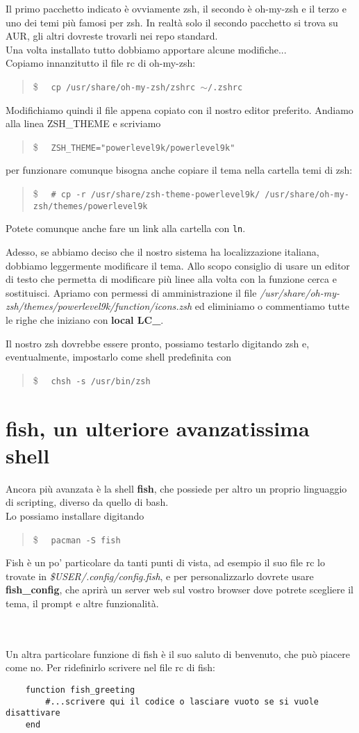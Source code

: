 \documentclass[twoside,italian]{book}
\newcommand{\code}[1]{\texttt{#1}}
\newcommand{\shellcode}[1]{\$$\quad$ \texttt{#1}}
\newcommand{\centcode}[1]{
	\begin{quote}
		\color{code}
		\shellcode{#1}
	\end{quote}
}
\newcommand{\nlinea}{
	\leavevmode
	\\
}
\begin{document}
			Il primo pacchetto indicato è ovviamente zsh, il secondo è oh-my-zsh e il terzo e uno dei temi più famosi per zsh. In realtà solo il secondo pacchetto si trova su AUR, gli altri dovreste trovarli nei repo standard.\\
			
			Una volta installato tutto dobbiamo apportare alcune modifiche...\\
			Copiamo innanzitutto il file rc di oh-my-zsh:\centcode{cp /usr/share/oh-my-zsh/zshrc $\sim$/.zshrc}
			
			Modifichiamo quindi il file appena copiato con il nostro editor preferito. Andiamo alla linea ZSH\_THEME e scriviamo \centcode{ZSH\_THEME="powerlevel9k/powerlevel9k"}
			
			per funzionare comunque bisogna anche copiare il tema nella cartella temi di zsh:
			\centcode{\# cp -r /usr/share/zsh-theme-powerlevel9k/ /usr/share/oh-my-zsh/themes/powerlevel9k}
			Potete comunque anche fare un link alla cartella con \code{ln}.
			
			Adesso, se abbiamo deciso che il nostro sistema ha localizzazione italiana, dobbiamo leggermente modificare il tema. Allo scopo consiglio di usare un editor di testo che permetta di modificare più linee alla volta con la funzione cerca e sostituisci. Apriamo con permessi di amministrazione il file \textit{/usr/share/oh-my-zsh/themes/powerlevel9k/function/icons.zsh} ed eliminiamo o commentiamo tutte le righe che iniziano con \textbf{local LC\_}.
			
			Il nostro zsh dovrebbe essere pronto, possiamo testarlo digitando zsh e, eventualmente, impostarlo come shell predefinita con \centcode{chsh -s /usr/bin/zsh}
			
		\section{fish, un ulteriore avanzatissima shell}
			
			Ancora più avanzata è la shell \textbf{fish}, che possiede per altro un proprio linguaggio di scripting, diverso da quello di bash.\\
			
			Lo possiamo installare digitando \centcode{pacman -S fish}
			
			Fish è un po' particolare da tanti punti di vista, ad esempio il suo file rc lo trovate in \textit{\$USER/.config/config.fish}, e per personalizzarlo dovrete usare \textbf{fish\_config}, che aprirà un server web sul vostro browser dove potrete scegliere il tema, il prompt e altre funzionalità.
			\nlinea
			\nlinea
			Un altra particolare funzione di fish è il suo saluto di benvenuto, che può piacere come no. Per ridefinirlo scrivere nel file rc di fish:
\begin{lstlisting}
	function fish_greeting
		#...scrivere qui il codice o lasciare vuoto se si vuole disattivare
	end
\end{lstlisting}
			
\end{document}
